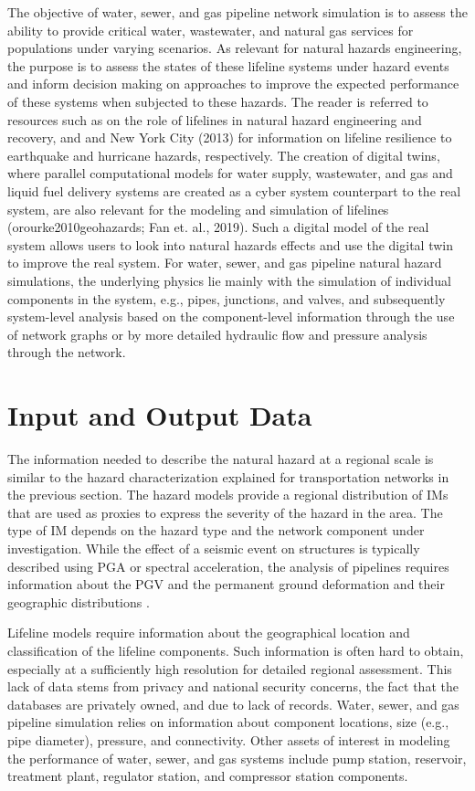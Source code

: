 The objective of water, sewer, and gas pipeline network simulation is to assess the ability to provide critical water, wastewater, and natural gas services for populations under varying scenarios. As relevant for natural hazards engineering, the purpose is to assess the states of these lifeline systems under hazard events and inform decision making on approaches to improve the expected performance of these systems when subjected to these hazards. The reader is referred to resources such as \cite{johnson2016critical} on the role of lifelines in natural hazard engineering and recovery, and \cite{orourke2014earthquakeresilient} and New York City (2013) for information on lifeline resilience to earthquake and hurricane hazards, respectively. The creation of digital twins, where parallel computational models for water supply, wastewater, and gas and liquid fuel delivery systems are created as a cyber system counterpart to the real system, are also relevant for the modeling and simulation of lifelines (orourke2010geohazards; Fan et. al., 2019). Such a digital model of the real system allows users to look into natural hazards effects and use the digital twin to improve the real system. For water, sewer, and gas pipeline natural hazard simulations, the underlying physics lie mainly with the simulation of individual components in the system, e.g., pipes, junctions, and valves, and subsequently system-level analysis based on the component-level information through the use of network graphs or by more detailed hydraulic flow and pressure analysis through the network.
 
\section{Input and Output Data}
\label{sec:perf_pipeline_io}

The information needed to describe the natural hazard at a regional scale is similar to the hazard characterization explained for transportation networks in the previous section. The hazard models provide a regional distribution of IMs that are used as proxies to express the severity of the hazard in the area. The type of IM depends on the hazard type and the network component under investigation. While the effect of a seismic event on structures is typically described using PGA or spectral acceleration, the analysis of pipelines requires information about the PGV and the permanent ground deformation and their geographic distributions \citep{romero2010seismic}.

Lifeline models require information about the geographical location and classification of the lifeline components. Such information is often hard to obtain, especially at a sufficiently high resolution for detailed regional assessment. This lack of data stems from privacy and national security concerns, the fact that the databases are privately owned, and due to lack of records. Water, sewer, and gas pipeline simulation relies on information about component locations, size (e.g., pipe diameter), pressure, and connectivity. Other assets of interest in modeling the performance of water, sewer, and gas systems include pump station, reservoir, treatment plant, regulator station, and compressor station components.

